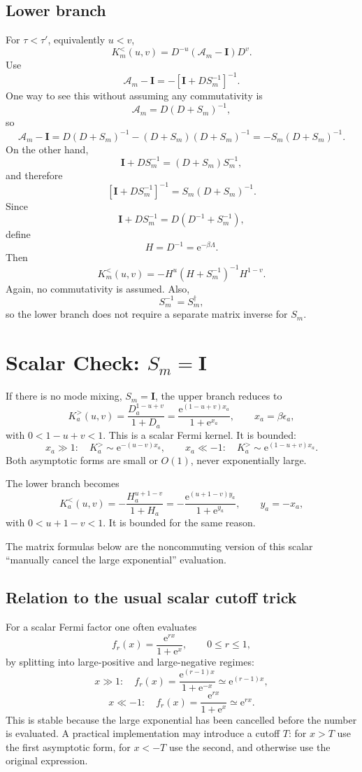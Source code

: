 \documentclass[11pt]{article}
\newcommand{\e}{\mathrm{e}}
\newcommand{\1}{\mathbb{1}}
\newcommand{\bI}{\mathbf{I}}
\newcommand{\br}[1]{\left(#1\right)}
\newcommand{\sq}[1]{\left[#1\right]}
\begin{document}
\subsection{Lower branch}

For \(\tau<\tau'\), equivalently \(u<v\),
\[
    K_m^<(u,v)
    =
    D^{-u}\br{\mathcal A_m-\bI}D^v.
\]
Use
\[
    \mathcal A_m-\bI
    =
    -\sq{\bI+D S_m^{-1}}^{-1}.
\]
One way to see this without assuming any commutativity is
\[
    \mathcal A_m
    =
    D(D+S_m)^{-1},
\]
so
\[
    \mathcal A_m-\bI
    =
    D(D+S_m)^{-1}-(D+S_m)(D+S_m)^{-1}
    =
    -S_m(D+S_m)^{-1}.
\]
On the other hand,
\[
    \bI+D S_m^{-1}
    =
    (D+S_m)S_m^{-1},
\]
and therefore
\[
    \sq{\bI+D S_m^{-1}}^{-1}
    =
    S_m(D+S_m)^{-1}.
\]
Since
\[
    \bI+D S_m^{-1}
    =
    D\br{D^{-1}+S_m^{-1}},
\]
define
\[
    H = D^{-1}=\e^{-\beta\Lambda}.
\]
Then
\[
    \boxed{
    K_m^<(u,v)
    =
    -H^u\br{H+S_m^{-1}}^{-1}H^{1-v}.
    }
\]
Again, no commutativity is assumed.  Also,
\[
    S_m^{-1}=S_m^\dagger,
\]
so the lower branch does not require a separate matrix inverse for \(S_m\).

\section{Scalar Check: \(S_m=\bI\)}

If there is no mode mixing, \(S_m=\bI\), the upper branch reduces to
\[
    K_a^>(u,v)
    =
    \frac{D_a^{1-u+v}}{1+D_a}
    =
    \frac{\e^{(1-u+v)x_a}}{1+\e^{x_a}},
    \qquad
    x_a=\beta\epsilon_a,
\]
with \(0<1-u+v<1\).  This is a scalar Fermi kernel.  It is bounded:
\[
    x_a\gg 1:
    \quad
    K_a^>\sim \e^{-(u-v)x_a},
    \qquad
    x_a\ll -1:
    \quad
    K_a^>\sim \e^{(1-u+v)x_a}.
\]
Both asymptotic forms are small or \(O(1)\), never exponentially large.

The lower branch becomes
\[
    K_a^<(u,v)
    =
    -\frac{H_a^{u+1-v}}{1+H_a}
    =
    -\frac{\e^{(u+1-v)y_a}}{1+\e^{y_a}},
    \qquad
    y_a=-x_a,
\]
with \(0<u+1-v<1\).  It is bounded for the same reason.

The matrix formulas below are the noncommuting version of this scalar
``manually cancel the large exponential'' evaluation.

\subsection{Relation to the usual scalar cutoff trick}

For a scalar Fermi factor one often evaluates
\[
    f_r(x)=\frac{\e^{rx}}{1+\e^x},
    \qquad
    0\le r\le 1,
\]
by splitting into large-positive and large-negative regimes:
\[
    x\gg 1:
    \quad
    f_r(x)
    =
    \frac{\e^{(r-1)x}}{1+\e^{-x}}
    \simeq
    \e^{(r-1)x},
\]
\[
    x\ll -1:
    \quad
    f_r(x)
    =
    \frac{\e^{rx}}{1+\e^x}
    \simeq
    \e^{rx}.
\]
This is stable because the large exponential has been cancelled before the
number is evaluated.  A practical implementation may introduce a cutoff
\(T\): for \(x>T\) use the first asymptotic form, for \(x<-T\) use the
second, and otherwise use the original expression.
\end{document}
